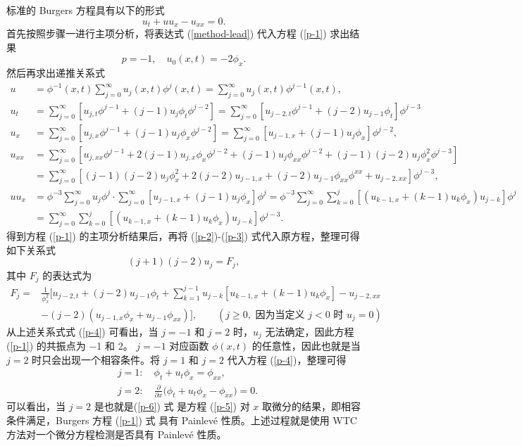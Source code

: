 标准的 Burgers 方程具有以下的形式
\begin{equation}
u_t + u u_x - u_{xx}=0.\label{p-1}
\end{equation}
首先按照步骤一进行主项分析，将表达式 (\ref{method-lead}) 代入方程 (\ref{p-1}) 求出结果
\begin{equation}
p=-1, \quad u_0(x,t)=-2 \phi_x.
\end{equation}
然后再求出递推关系式
\begin{align}
u&=\phi^{-1}(x,t)\sum_{j=0}^{\infty}u_j(x,t)\phi^j(x,t)=\sum_{j=0}^{\infty}u_j(x,t)\phi^{j-1}(x,t),\label{p-2}\\
u_t&=\sum_{j=0}^{\infty}[u_{j,t}\phi^{j-1}+(j-1)u_j\phi_t\phi^{j-2}]=\sum_{j=0}^{\infty}[u_{j-2,t}\phi^{j-1}+(j-2)u_{j-1}\phi_t]\phi^{j-3} \\
u_x&=\sum_{j=0}^{\infty}[u_{j,x}\phi^{j-1}+(j-1)u_j\phi_x\phi^{j-2}]=\sum_{j=0}^{\infty}[u_{j-1,x}+(j-1)u_{j}\phi_x]\phi^{j-2}, \\
u_{xx}&=\sum_{j=0}^{\infty}[u_{j,xx}\phi^{j-1}+2(j-1)u_{j,x}\phi_x\phi^{j-2}+(j-1)u_j\phi_{xx}\phi^{j-2}+(j-1)(j-2)u_j\phi_x^2\phi^{j-3}]\nonumber\\
&=\sum_{j=0}^{\infty}[(j-1)(j-2)u_{j}\phi_x^2+2(j-2)u_{j-1,x}+(j-2)u_{j-1}\phi_{xx}\phi^{xx}+u_{j-2,xx}]\phi^{j-3}, \\
uu_x&=\phi^{-3}\sum_{j=0}^{\infty}u_j\phi^j\cdotp \sum_{j=0}^{\infty}[u_{j-1,x}+(j-1)u_j\phi_x]\phi^j =\phi^{-3}\sum_{j=0}^{\infty}\sum_{k=0}^{j}[(u_{k-1,x}+(k-1)u_k\phi_x)u_{j-k}]\phi^j\nonumber\\
&=\sum_{j=0}^{\infty}\sum_{k=0}^{j}[(u_{k-1,x}+(k-1)u_k\phi_x)u_{j-k}]\phi^{j-3}.\label{p-3}
\end{align}
得到方程 (\ref{p-1}) 的主项分析结果后，再将 (\ref{p-2})-(\ref{p-3}) 式代入原方程，整理可得如下关系式
\begin{equation}
(j+1)(j-2)u_j=F_j,\label{p-4}
\end{equation}
其中 $F_j$ 的表达式为
\begin{align}
F_j=&\frac{1}{\phi_x^2}\big[ u_{j-2,t} + (j-2) u_{j-1}\phi_t +\sum^{j-1}_{k=1} u_{j-k} [ u_{k-1,x} +
(k-1) u_k \phi_x] -u_{j-2,xx} \nonumber\\
&- (j-2)(u_{j-1,x} \phi_x +u_{j-1} \phi_{xx}) \big],  \qquad (j\geq 0, \mbox{ 因为当定义 }  j<0 \mbox{ 时 } u_j=0 )
\end{align}
从上述关系式式 (\ref{p-4}) 可看出，当 $j = −1$ 和 $j = 2$ 时，$u_j$ 无法确定，因此方程 (\ref{p-1}) 的共振点为 −1 和 2。 $j = −1$ 对应函数 $\phi(x,t)$ 的任意性，因此也就是当 $j = 2$ 时只会出现一个相容条件。将 $j = 1$ 和 $j = 2$ 代入方程 (\ref{p-4})，整理可得
\begin{align}
& j=1: \quad \phi_t +u_t \phi_x=\phi_{xx},\label{p-5}\\
& j=2: \quad \frac{\partial}{\partial x}\big( \phi_t+u_t \phi_x - \phi_{xx} \big)=0. \label{p-6}
\end{align}
可以看出，当 $j = 2$ 是也就是(\ref{p-6}) 式 是方程 (\ref{p-5}) 对 $x$ 取微分的结果，即相容条件满足，Burgers 方程 (\ref{p-1}) 式 具有 Painlev\'{e} 性质。上述过程就是使用 WTC 方法对一个微分方程检测是否具有 Painlev\'{e} 性质。

